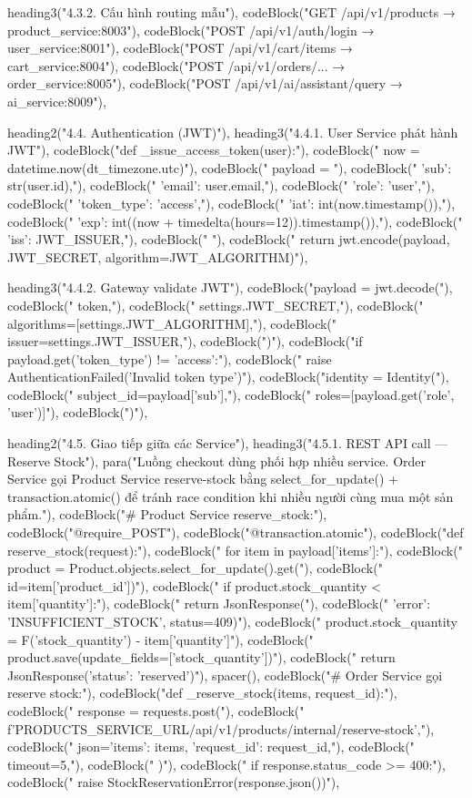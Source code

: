 {{{  heading3("4.3.2. Cấu hình routing mẫu"),
  codeBlock("GET  /api/v1/products  →  product_service:8003"),
  codeBlock("POST /api/v1/auth/login  →  user_service:8001"),
  codeBlock("POST /api/v1/cart/items  →  cart_service:8004"),
  codeBlock("POST /api/v1/orders/...  →  order_service:8005"),
  codeBlock("POST /api/v1/ai/assistant/query  →  ai_service:8009"),

  heading2("4.4. Authentication (JWT)"),
  heading3("4.4.1. User Service phát hành JWT"),
  codeBlock("def _issue_access_token(user):"),
  codeBlock("    now = datetime.now(dt_timezone.utc)"),
  codeBlock("    payload = {"),
  codeBlock("        'sub': str(user.id),"),
  codeBlock("        'email': user.email,"),
  codeBlock("        'role': 'user',"),
  codeBlock("        'token_type': 'access',"),
  codeBlock("        'iat': int(now.timestamp()),"),
  codeBlock("        'exp': int((now + timedelta(hours=12)).timestamp()),"),
  codeBlock("        'iss': JWT_ISSUER,"),
  codeBlock("    }"),
  codeBlock("    return jwt.encode(payload, JWT_SECRET, algorithm=JWT_ALGORITHM)"),

  heading3("4.4.2. Gateway validate JWT"),
  codeBlock("payload = jwt.decode("),
  codeBlock("    token,"),
  codeBlock("    settings.JWT_SECRET,"),
  codeBlock("    algorithms=[settings.JWT_ALGORITHM],"),
  codeBlock("    issuer=settings.JWT_ISSUER,"),
  codeBlock(")"),
  codeBlock("if payload.get('token_type') != 'access':"),
  codeBlock("    raise AuthenticationFailed('Invalid token type')"),
  codeBlock("identity = Identity("),
  codeBlock("    subject_id=payload['sub'],"),
  codeBlock("    roles=[payload.get('role', 'user')]"),
  codeBlock(")"),

  heading2("4.5. Giao tiếp giữa các Service"),
  heading3("4.5.1. REST API call — Reserve Stock"),
  para("Luồng checkout dùng phối hợp nhiều service. Order Service gọi Product Service reserve-stock bằng select_for_update() + transaction.atomic() để tránh race condition khi nhiều người cùng mua một sản phẩm."),
  codeBlock("# Product Service reserve_stock:"),
  codeBlock("@require_POST"),
  codeBlock("@transaction.atomic"),
  codeBlock("def reserve_stock(request):"),
  codeBlock("    for item in payload['items']:"),
  codeBlock("        product = Product.objects.select_for_update().get("),
  codeBlock("            id=item['product_id'])"),
  codeBlock("        if product.stock_quantity < item['quantity']:"),
  codeBlock("            return JsonResponse("),
  codeBlock("                {'error': 'INSUFFICIENT_STOCK'}, status=409)"),
  codeBlock("        product.stock_quantity = F('stock_quantity') - item['quantity']"),
  codeBlock("        product.save(update_fields=['stock_quantity'])"),
  codeBlock("    return JsonResponse({'status': 'reserved'})"),
  spacer(),
  codeBlock("# Order Service gọi reserve stock:"),
  codeBlock("def _reserve_stock(items, request_id):"),
  codeBlock("    response = requests.post("),
  codeBlock("        f'{PRODUCTS_SERVICE_URL}/api/v1/products/internal/reserve-stock',"),
  codeBlock("        json={'items': items, 'request_id': request_id},"),
  codeBlock("        timeout=5,"),
  codeBlock("    )"),
  codeBlock("    if response.status_code >= 400:"),
  codeBlock("        raise StockReservationError(response.json())"),

}}}

